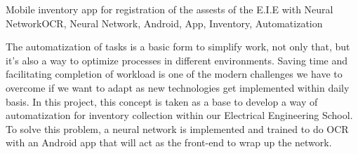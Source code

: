 
\begin{theabstract}{Mobile inventory app for registration of the assests of the E.I.E with Neural Network}{OCR, Neural Network, Android, App, Inventory, Automatization}

The automatization of tasks is a basic form to simplify work, not only that, but it's also a way to optimize processes in different environments. Saving time and facilitating completion of workload is one of the modern challenges we have to overcome if we want to adapt as new technologies get implemented within daily basis. In this project, this concept is taken as a base to develop a way of automatization for inventory collection within our Electrical Engineering School. To solve this problem, a neural network is implemented and trained to do OCR with an Android app that will act as the front-end to wrap up the network. 
\end{theabstract}


